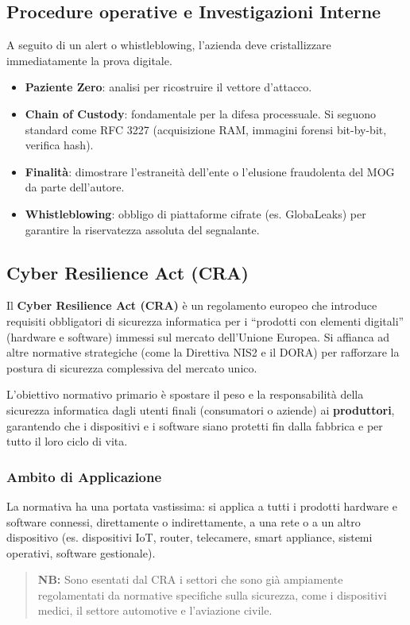 \documentclass[11pt,a4paper]{article}
\begin{document}
\subsection{Procedure operative e Investigazioni Interne}
A seguito di un alert o whistleblowing, l'azienda deve cristallizzare immediatamente la prova digitale.
\begin{itemize}
    \item \textbf{Paziente Zero}: analisi per ricostruire il vettore d'attacco.
    \item \textbf{Chain of Custody}: fondamentale per la difesa processuale. Si seguono standard come RFC 3227 (acquisizione RAM, immagini forensi bit-by-bit, verifica hash).
    \item \textbf{Finalità}: dimostrare l'estraneità dell'ente o l'elusione fraudolenta del MOG da parte dell'autore.
    \item \textbf{Whistleblowing}: obbligo di piattaforme cifrate (es. GlobaLeaks) per garantire la riservatezza assoluta del segnalante.
\end{itemize}

\subsection{Cyber Resilience Act (CRA)}

Il \textbf{Cyber Resilience Act (CRA)} è un regolamento europeo che introduce requisiti obbligatori di sicurezza informatica per i ``prodotti con elementi digitali'' (hardware e software) immessi sul mercato dell'Unione Europea. Si affianca ad altre normative strategiche (come la Direttiva NIS2 e il DORA) per rafforzare la postura di sicurezza complessiva del mercato unico.

L'obiettivo normativo primario è spostare il peso e la responsabilità della sicurezza informatica dagli utenti finali (consumatori o aziende) ai \textbf{produttori}, garantendo che i dispositivi e i software siano protetti fin dalla fabbrica e per tutto il loro ciclo di vita.

\subsubsection{Ambito di Applicazione}
La normativa ha una portata vastissima: si applica a tutti i prodotti hardware e software connessi, direttamente o indirettamente, a una rete o a un altro dispositivo (es. dispositivi IoT, router, telecamere, smart appliance, sistemi operativi, software gestionale). 
\begin{quote}
\textbf{NB:} Sono esentati dal CRA i settori che sono già ampiamente regolamentati da normative specifiche sulla sicurezza, come i dispositivi medici, il settore automotive e l'aviazione civile.
\end{quote}
\end{document}
